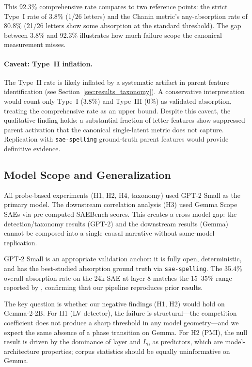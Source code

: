 \documentclass{article}
\begin{document}
This 92.3\% comprehensive rate compares to two reference points: the strict Type~I rate of 3.8\% (1/26 letters) and the Chanin metric's any-absorption rate of 80.8\% (21/26 letters show some absorption at the standard threshold). The gap between 3.8\% and 92.3\% illustrates how much failure scope the canonical measurement misses.

\paragraph{Caveat: Type~II inflation.} The Type~II rate is likely inflated by a systematic artifact in parent feature identification (see Section~\ref{sec:results_taxonomy}). A conservative interpretation would count only Type~I (3.8\%) and Type~III (0\%) as validated absorption, treating the comprehensive rate as an upper bound. Despite this caveat, the qualitative finding holds: a substantial fraction of letter features show suppressed parent activation that the canonical single-latent metric does not capture. Replication with \texttt{sae-spelling} ground-truth parent features would provide definitive evidence.

\subsection{Model Scope and Generalization}

All probe-based experiments (H1, H2, H4, taxonomy) used GPT-2 Small as the primary model. The downstream correlation analysis (H3) used Gemma Scope SAEs via pre-computed SAEBench scores. This creates a cross-model gap: the detection/taxonomy results (GPT-2) and the downstream results (Gemma) cannot be composed into a single causal narrative without same-model replication.

GPT-2 Small is an appropriate validation anchor: it is fully open, deterministic, and has the best-studied absorption ground truth via \texttt{sae-spelling}. The 35.4\% overall absorption rate on the 24k SAE at layer 8 matches the 15--35\% range reported by \citet{chanin2024absorption}, confirming that our pipeline reproduces prior results.

The key question is whether our negative findings (H1, H2) would hold on Gemma-2-2B. For H1 (LV detector), the failure is structural---the competition coefficient does not produce a sharp threshold in any model geometry---and we expect the same absence of a phase transition on Gemma. For H2 (PMI), the null result is driven by the dominance of layer and $L_0$ as predictors, which are model-architecture properties; corpus statistics should be equally uninformative on Gemma.
\end{document}
